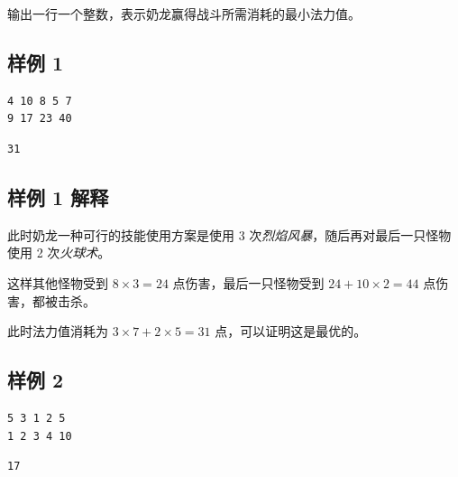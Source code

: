输出一行一个整数，表示奶龙赢得战斗所需消耗的最小法力值。

\subsection{样例 1}
\begin{minipage}{\linewidth}
   \begin{minipage}[t]{0.49\linewidth}
      \begin{lstlisting}[title=\texttt{standard input}]
4 10 8 5 7
9 17 23 40
\end{lstlisting}
   \end{minipage}
   \begin{minipage}[t]{0.49\linewidth}
      \begin{lstlisting}[title=\texttt{standard output}]
31
\end{lstlisting}
   \end{minipage}
\end{minipage}

\subsection{样例 1 解释}

此时奶龙一种可行的技能使用方案是使用 3 次\textit{烈焰风暴}，随后再对最后一只怪物使用 2 次\textit{火球术}。

这样其他怪物受到 $8 \times 3 = 24$ 点伤害，最后一只怪物受到 $24 + 10 \times 2 = 44$ 点伤害，都被击杀。

此时法力值消耗为 $3 \times 7 + 2 \times 5 = 31$ 点，可以证明这是最优的。

\subsection{样例 2}
\begin{minipage}{\linewidth}
   \begin{minipage}[t]{0.49\linewidth}
      \begin{lstlisting}[title=\texttt{standard input}]
5 3 1 2 5
1 2 3 4 10
\end{lstlisting}
   \end{minipage}
   \begin{minipage}[t]{0.49\linewidth}
      \begin{lstlisting}[title=\texttt{standard output}]
17
\end{lstlisting}
   \end{minipage}
\end{minipage}